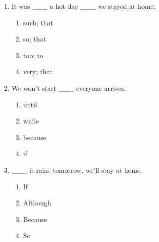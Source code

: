 \documentclass[11pt,a4paper]{ctexart}
\begin{document}
\begin{enumerate}[leftmargin=*,itemsep=4pt]
\begin{enumerate}[label=\Alph*.,leftmargin=2em,itemsep=1pt,topsep=2pt]
\item very; that
\end{enumerate}
\item It was \_\_\_ a hot day \_\_\_ we stayed at home.
\begin{enumerate}[label=\Alph*.,leftmargin=2em,itemsep=1pt,topsep=2pt]
\item such; that
\item so; that
\item too; to
\item very; that
\end{enumerate}
\item We won’t start \_\_\_ everyone arrives.
\begin{enumerate}[label=\Alph*.,leftmargin=2em,itemsep=1pt,topsep=2pt]
\item until
\item while
\item because
\item if
\end{enumerate}
\item \_\_\_ it rains tomorrow, we’ll stay at home.
\begin{enumerate}[label=\Alph*.,leftmargin=2em,itemsep=1pt,topsep=2pt]
\item If
\item Although
\item Because
\item So
\end{enumerate}
\end{enumerate}

\newpage
\end{document}
